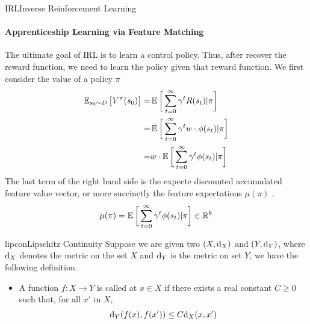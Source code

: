 \documentclass[9pt]{article}
\begin{document}
\begin{topic}{IRL}{Inverse Reinforcement Learning}
\paragraph{Apprenticeship Learning via Feature Matching} The ultimate goal of IRL is to learn a control policy. Thus, after recover the reward function, we need to learn the policy given that reward function. We first consider the value of a policy $\pi$
\[
\begin{split}
\operatorname{\mathbb{E}}_{s_0 \sim D}\big[V^{\pi}(s_0)\big] = & \operatorname{\mathbb{E}}\bigg[\sum_{t=0}^{\infty} \gamma^t R(s_t)|\pi \bigg]\\
= & \operatorname{\mathbb{E}}\bigg[\sum_{t=0}^{\infty} \gamma^t w \cdot \phi(s_t)|\pi \bigg]\\
= & w \cdot \operatorname{\mathbb{E}}\bigg[\sum_{t=0}^{\infty} \gamma^t \phi(s_t)|\pi \bigg]
\end{split}
\]
The last term of the right hand side is the expecte discounted accumulated feature value vector, or more succinctly the feature expectations $\mu(\pi)$ \citep{Abbeel2004Apprenticeship}.
\[
\mu(\pi) = \operatorname{\mathbb{E}}\bigg[\sum_{t=0}^{\infty} \gamma^t \phi(s_t)|\pi \bigg] \in \mathbb{R}^k
\]
\citep{Abbeel2004Apprenticeship}
\citep{Ziebart2008Maximum}
\citep{Syed2007Game}
\citep{Finn2016Guided}
\citep{Levine2011Nonlinear}

\end{topic}

\begin{topic}{lipcon}{Lipschitz Continuity}
Suppose we are given two  $(X,\mathrm{d}_X)$ and $(Y,\mathrm{d}_Y)$, where $\mathrm{d}_X$ denotes the metric on the set $X$ and $\mathrm{d}_Y$ is the metric on set $Y$, we have the following definition.
\begin{itemize}
\item A function $f:X\rightarrow Y$ is called  at $x\in X$ if there exists a real constant $C\geq 0$ such that, for all $x'$ in $X$,
\[
\mathrm{d}_Y(f(x), f(x')) \le C \mathrm{d}_X(x, x')
\]
\end{itemize}
\citep{Eriksson2013Applied}
\end{topic}
\end{document}
